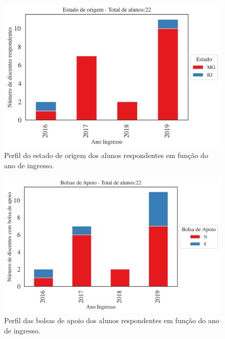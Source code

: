 \documentclass[a4paper,10pt]{article}
\begin{document}
\begin{figure}[h]
\centering
\includegraphics[width=0.85\linewidth]{quantitativos_estado_de_origem_5000613.png}
\caption{\label{fig:estado_ano} Perfil do estado de origem dos alunos respondentes em função do ano de ingresso.}
\end{figure}

\begin{figure}[h]
\centering
\includegraphics[width=0.85\linewidth]{quantitativos_bolsa_de_apoio_5000613.png}
\caption{\label{fig:bolsa_ano} Perfil das bolsas de apoio  dos alunos respondentes em função do ano de ingresso.}
\end{figure}
\end{document}
